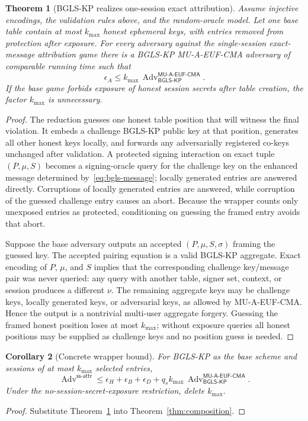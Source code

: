 \documentclass[11pt]{article}
\newtheorem{theorem}{Theorem}[section]
\newtheorem{corollary}[theorem]{Corollary}
\theoremstyle{definition}
\begin{document}
\begin{theorem}[BGLS-KP realizes one-session exact attribution]\label{thm:bgls-base}
Assume injective encodings, the validation rules above, and the random-oracle model.  Let one base table contain at most $k_{\max}$ honest ephemeral keys, with entries removed from protection after exposure.  For every adversary against the single-session exact-message attribution game there is a BGLS-KP MU-A-EUF-CMA adversary of comparable running time such that
\[
 \epsilon_A\leq k_{\max}\,
 \operatorname{Adv}^{\mathsf{MU\mbox{-}A\mbox{-}EUF\mbox{-}CMA}}_{\mathsf{BGLS\mbox{-}KP}}.
 \label{eq:bgls-base-bound}
\]
If the base game forbids exposure of honest session secrets after table creation, the factor $k_{\max}$ is unnecessary.
\end{theorem}
\begin{proof}
The reduction guesses one honest table position that will witness the final violation.  It embeds a challenge BGLS-KP public key at that position, generates all other honest keys locally, and forwards any adversarially registered co-keys unchanged after validation.  A protected signing interaction on exact tuple $(P,\mu,S)$ becomes a signing-oracle query for the challenge key on the enhanced message determined by~\eqref{eq:bgls-message}; locally generated entries are answered directly.  Corruptions of locally generated entries are answered, while corruption of the guessed challenge entry causes an abort.  Because the wrapper counts only unexposed entries as protected, conditioning on guessing the framed entry avoids that abort.

Suppose the base adversary outputs an accepted $(P,\mu,S,\sigma)$ framing the guessed key.  The accepted pairing equation is a valid BGLS-KP aggregate.  Exact encoding of $P$, $\mu$, and $S$ implies that the corresponding challenge key/message pair was never queried: any query with another table, signer set, context, or session produces a different $\nu$.  The remaining aggregate keys may be challenge keys, locally generated keys, or adversarial keys, as allowed by MU-A-EUF-CMA.  Hence the output is a nontrivial multi-user aggregate forgery.  Guessing the framed honest position loses at most $k_{\max}$; without exposure queries all honest positions may be supplied as challenge keys and no position guess is needed.
\end{proof}

\begin{corollary}[Concrete wrapper bound]\label{cor:bgls-composition}
For BGLS-KP as the base scheme and sessions of at most $k_{\max}$ selected entries,
\[
 \operatorname{Adv}^{\mathsf{ss\mbox{-}attr}}
 \leq \epsilon_H+\epsilon_B+\epsilon_D
 +q_s k_{\max}\,
 \operatorname{Adv}^{\mathsf{MU\mbox{-}A\mbox{-}EUF\mbox{-}CMA}}_{\mathsf{BGLS\mbox{-}KP}}.
\]
Under the no-session-secret-exposure restriction, delete $k_{\max}$.
\end{corollary}
\begin{proof}
Substitute Theorem~\ref{thm:bgls-base} into Theorem~\ref{thm:composition}.
\end{proof}
\end{document}
